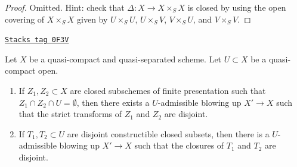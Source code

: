 \begin{proof}
Omitted. Hint: check that $\Delta : X \to X \times_S X$ is
closed by using the open covering of $X \times_S X$ given by
$U \times_S U$, $U \times_S V$, $V \times_S U$, and $V \times_S V$.
\end{proof}

\begin{lemma}
\label{flat-lemma-separate-disjoint-locally-closed-by-blowing-up}
\href{https://stacks.math.columbia.edu/tag/0F3V}{\texttt{Stacks tag 0F3V}}

Let $X$ be a quasi-compact and quasi-separated scheme.
Let $U \subset X$ be a quasi-compact open.
\begin{enumerate}
\item If $Z_1, Z_2 \subset X$ are closed subschemes of finite
presentation such that $Z_1 \cap Z_2 \cap U = \emptyset$, then
there exists a $U$-admissible blowing up $X' \to X$
such that the strict transforms of $Z_1$ and $Z_2$ are disjoint.
\item If $T_1, T_2 \subset U$ are disjoint constructible closed subsets, then
there is a $U$-admissible blowing up $X' \to X$ such that the closures of
$T_1$ and $T_2$ are disjoint.
\end{enumerate}
\end{lemma}

